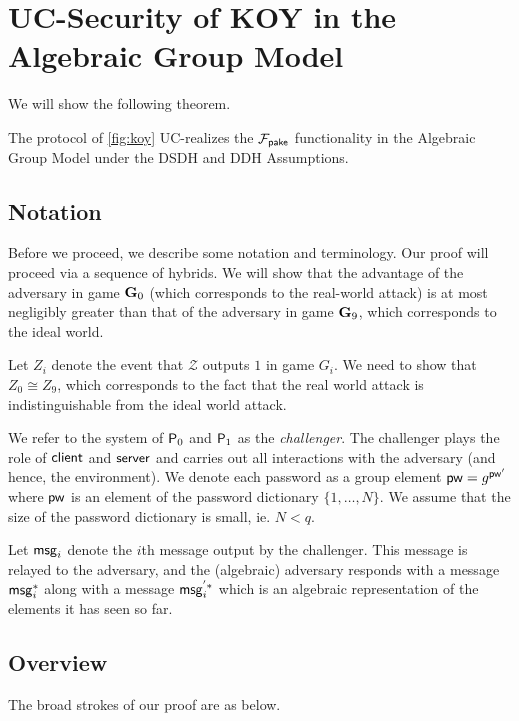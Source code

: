 \section{UC-Security of KOY in the Algebraic Group Model}

We will show the following theorem.

\begin{theorem}
	\label{thm:agm}
	The protocol of \cref{fig:koy} UC-realizes the $\mathcal{F}_{\mathsf{pake}}$ functionality in the Algebraic Group Model under the DSDH and DDH Assumptions.
\end{theorem}

\subsection{Notation}

Before we proceed, we describe some notation and terminology. Our proof will proceed via a sequence of hybrids. We will show that the advantage of the adversary in game $\mathbf{G}_0$ (which corresponds to the real-world attack) is at most negligibly greater than that of the adversary in game $\mathbf{G}_9$, which corresponds to the ideal world.

Let $Z_i$ denote the event that $\mathcal{Z}$ outputs $1$ in game $G_i$. We need to show that $Z_0\cong Z_9$, which corresponds to the fact that the real world attack is indistinguishable from the ideal world attack.

We refer to the system of $\mathsf{P}_0$ and $\mathsf{P}_1$ as the \textit{challenger}. The challenger plays the role of $\mathsf{client}$ and $\mathsf{server}$ and carries out all interactions with the adversary (and hence, the environment). We denote each password as a group element $\mathsf{pw} = g^{\mathsf{pw}'}$ where $\mathsf{pw}$ is an element of the password dictionary $\{1,\dots,N\}$. We assume that the size of the password dictionary is small, ie. $N<q$.

Let $\mathsf{msg}_{i}$ denote the $i$th message output by the challenger. This message is relayed to the adversary, and the (algebraic) adversary responds with a message $\mathsf{msg}_{i}^{*}$ along with a message $\mathsf{msg}_{i}^{'*}$ which is an algebraic representation of the elements it has seen so far. 


\subsection{Overview}

The broad strokes of our proof are as below.

